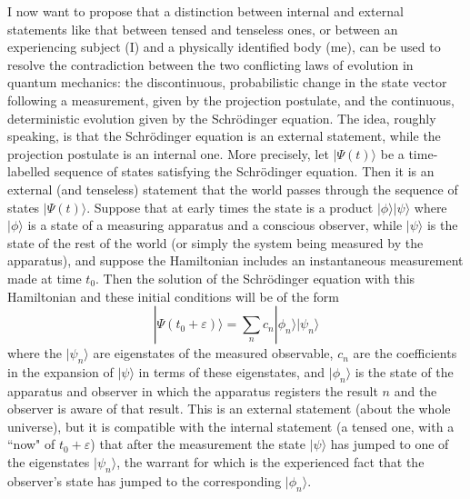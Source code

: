 \documentclass[12pt,a4paper,reqno]{article}
\renewcommand{\(}{\left(}
\renewcommand{\)}{\right)}
\renewcommand{\epsilon}{\varepsilon}
\newcommand{\<}{\langle}
\renewcommand{\>}{\rangle}
\theoremstyle{plain} %
\theoremstyle{definition}
\theoremstyle{remark}
\begin{document}
I now want to propose that a distinction between internal and external
statements like that between tensed and
tenseless ones, or between an experiencing subject (I) and
a physically identified body (me), can be used to resolve the
contradiction between the two conflicting laws of evolution in quantum
mechanics: the discontinuous, probabilistic change in the state vector
following a measurement, given by the projection postulate, and the
continuous, deterministic evolution given by the Schr\"odinger equation.
The idea, roughly speaking, is that the Schr\"odinger equation is an
external statement, while the projection postulate is an internal one.
More precisely, let $|\Psi(t)\>$ be a time-labelled sequence of states
satisfying the Schr\"odinger equation. Then it is an external (and
tenseless) statement that the world passes through the sequence of
states $|\Psi (t)\>$. Suppose that at early times the state is a product
$|\phi\>|\psi\>$ where $|\phi\>$ is a state of a measuring
apparatus and a conscious observer, while $|\psi\>$ is the state of
the rest of the world (or simply the system being measured by the
apparatus), and suppose the Hamiltonian includes an instantaneous
measurement made at time $t_0$. Then the solution of the Schr\"odinger
equation with this Hamiltonian and these initial conditions will be of the form
\[
|\Psi(t_0 + \varepsilon)\> = \sum_n c_n|\phi_n\>|\psi_n\>
\]
where the $|\psi_n\>$ are eigenstates of the measured observable, $c_n$
are the coefficients in the expansion of $|\psi\>$ in terms of these
eigenstates, and $|\phi_n\>$ is the state of the apparatus and observer
in which the apparatus registers the result $n$ and the observer is
aware of that result. This is an external statement (about the whole
universe), but it is compatible with the internal statement (a tensed
one, with a ``now" of $t_0 + \epsilon$) that after the measurement the
state $|\psi\>$ has jumped to one of the eigenstates $|\psi_n\>$, the
warrant for which is the experienced fact that the observer's state has
jumped to the corresponding $|\phi_n\>$.
\end{document}
